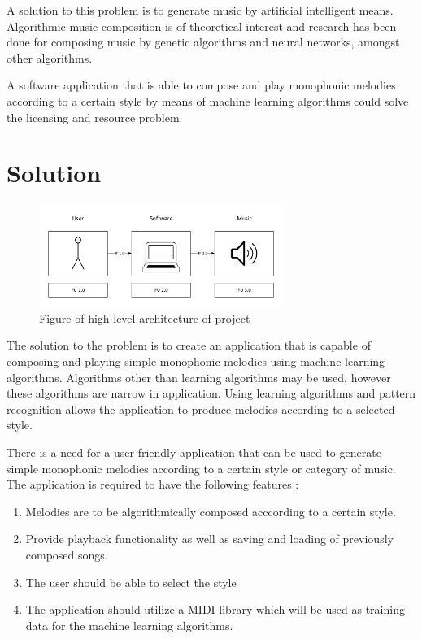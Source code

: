 A solution to this problem is to generate music by artificial intelligent means. 
Algorithmic music composition is of theoretical interest and research has been done for composing music by genetic algorithms and neural networks, amongst other algorithms.

A software application that is able to compose and play monophonic melodies according to a certain style by means of machine learning algorithms could solve the licensing and resource problem.

\section{Solution}
\begin{figure}
\centerline{\includegraphics[width=300px]{../images/arch.pdf}}
\caption{Figure of high-level architecture of project}
\label{ims:archm}
\end{figure}

The solution to the problem is to create an application that is capable of composing and playing simple monophonic melodies using machine learning algorithms. Algorithms other than learning algorithms may be used, however these algorithms are narrow in application. Using learning algorithms and pattern recognition allows the application to produce melodies according to a selected style.

There is a need for a user-friendly application that can be used to generate simple monophonic melodies according to a certain style or category of music.
The application is required to have the following features :
\begin{enumerate}
\item Melodies are to be algorithmically composed acccording to a certain style.
\item Provide playback functionality as well as saving and loading of previously composed songs.
\item The user should be able to select the style
\item The application should utilize a \acs{MIDI} library which will be used as training data for the machine learning algorithms.
\end{enumerate}

